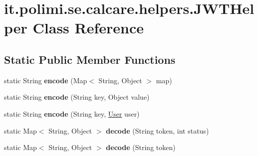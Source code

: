 \hypertarget{classit_1_1polimi_1_1se_1_1calcare_1_1helpers_1_1JWTHelper}{}\section{it.\+polimi.\+se.\+calcare.\+helpers.\+J\+W\+T\+Helper Class Reference}
\label{classit_1_1polimi_1_1se_1_1calcare_1_1helpers_1_1JWTHelper}
\subsection*{Static Public Member Functions}
\begin{DoxyCompactItemize}
\item 
\hypertarget{classit_1_1polimi_1_1se_1_1calcare_1_1helpers_1_1JWTHelper_ab41f089e7e3ce816c53c1bfcfb05505d}{}static String {\bfseries encode} (Map$<$ String, Object $>$ map)\label{classit_1_1polimi_1_1se_1_1calcare_1_1helpers_1_1JWTHelper_ab41f089e7e3ce816c53c1bfcfb05505d}

\item 
\hypertarget{classit_1_1polimi_1_1se_1_1calcare_1_1helpers_1_1JWTHelper_a9c2d140737ed8fe485d728dd70a1a5ba}{}static String {\bfseries encode} (String key, Object value)\label{classit_1_1polimi_1_1se_1_1calcare_1_1helpers_1_1JWTHelper_a9c2d140737ed8fe485d728dd70a1a5ba}

\item 
\hypertarget{classit_1_1polimi_1_1se_1_1calcare_1_1helpers_1_1JWTHelper_a5c5b4bee0843be999a4f0287b3702348}{}static String {\bfseries encode} (String key, \hyperlink{classit_1_1polimi_1_1se_1_1calcare_1_1entities_1_1User}{User} user)\label{classit_1_1polimi_1_1se_1_1calcare_1_1helpers_1_1JWTHelper_a5c5b4bee0843be999a4f0287b3702348}

\item 
\hypertarget{classit_1_1polimi_1_1se_1_1calcare_1_1helpers_1_1JWTHelper_aa342954131b477dafc377fdc30f6f6bd}{}static Map$<$ String, Object $>$ {\bfseries decode} (String token, int status)\label{classit_1_1polimi_1_1se_1_1calcare_1_1helpers_1_1JWTHelper_aa342954131b477dafc377fdc30f6f6bd}

\item 
\hypertarget{classit_1_1polimi_1_1se_1_1calcare_1_1helpers_1_1JWTHelper_a1123aa462e87e5873a56be67f5bd4d41}{}static Map$<$ String, Object $>$ {\bfseries decode} (String token)\label{classit_1_1polimi_1_1se_1_1calcare_1_1helpers_1_1JWTHelper_a1123aa462e87e5873a56be67f5bd4d41}


\end{DoxyCompactItemize}
